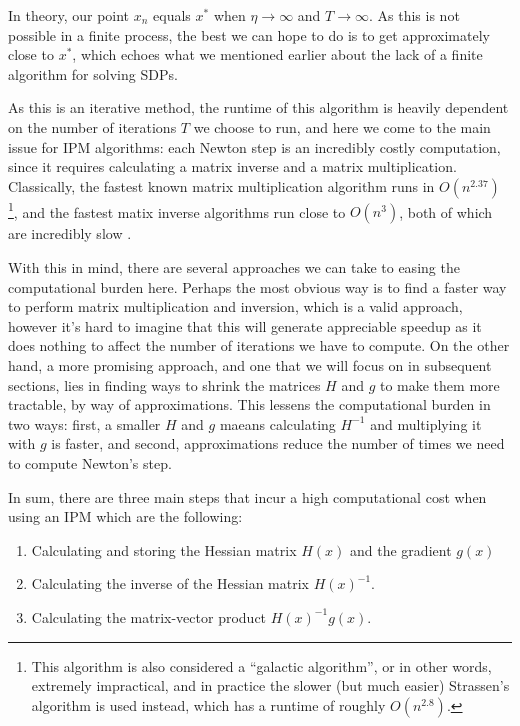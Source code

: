 \documentclass[11pt]{article}
\begin{document}
	In theory, our point \( x_n \) equals \( x^{*} \) when \( \eta \to \infty \) and \( T \to \infty \). 
	As this is not possible 
	in a finite process, the best we can hope to do is to get approximately close to \( x^{*} \), which echoes 
	what we mentioned earlier about the lack of a finite algorithm for solving SDPs. 

	As this is an iterative method, the runtime of this algorithm is heavily dependent on the number of iterations
	\( T \) we choose to run, and here we come to the main issue for IPM algorithms: each Newton step is an 
	incredibly costly computation, since it requires calculating a matrix inverse and a matrix multiplication. 
	Classically, the fastest known matrix multiplication algorithm runs in \( O(n^{2.37}) \)
	\footnote{This algorithm 
		is also considered a ``galactic algorithm'', or in other words, extremely impractical, and in practice 
		the slower (but much easier) Strassen's algorithm is used instead, which has a runtime of roughly 
	\( O(n^{2.8}) \).}, and the fastest matix inverse algorithms run close to \( O(n^3) \), both of which are 
	incredibly slow \cite{tonksFastMatrixInversion2019}.  

	With this in mind, there are several approaches we can take to easing the computational burden here. Perhaps 
	the most obvious way is to find a faster way to perform matrix multiplication and inversion, which is a valid 
	approach, however it's hard to imagine that this will generate appreciable speedup as it does nothing to affect 
	the number of iterations we have to compute. On the other hand, 
	a more promising approach, and one that we will focus on 
	in subsequent sections, lies in finding ways to shrink the matrices \( H \) and \( g \) to make them more 
	tractable, by way of approximations. This lessens the computational burden in two ways: first, a smaller \( H \)
	and \( g \) maeans calculating \( H^{-1} \) and multiplying it with \( g \) is faster, and second, 
	approximations reduce the number of times we need to compute Newton's step. 


In sum, there are three main steps that incur a high computational cost when using an IPM which are the following:

\begin{enumerate}
\item Calculating and storing the Hessian matrix $H(x)$ and the gradient $g(x)$
    \item Calculating the inverse of the Hessian matrix $H(x)^{-1}$.
    \item Calculating the matrix-vector product $H(x)^{-1}g(x)$.
\end{enumerate}
\end{document}
